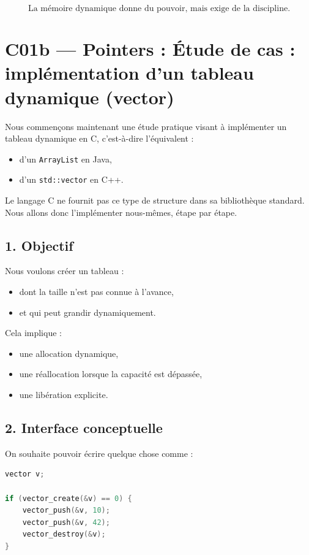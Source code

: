 \[
\boxed{\text{La mémoire dynamique donne du pouvoir, mais exige de la discipline.}}
\]

\section{C01b — Pointers : Étude de cas : implémentation d’un tableau dynamique (vector)}

Nous commençons maintenant une étude pratique visant à implémenter
un tableau dynamique en C, c’est-à-dire l’équivalent :

\begin{itemize}
    \item d’un \texttt{ArrayList} en Java,
    \item d’un \texttt{std::vector} en C++.
\end{itemize}

Le langage C ne fournit pas ce type de structure dans sa bibliothèque standard.
Nous allons donc l’implémenter nous-mêmes, étape par étape.

\subsection*{1. Objectif}

Nous voulons créer un tableau :

\begin{itemize}
    \item dont la taille n’est pas connue à l’avance,
    \item et qui peut grandir dynamiquement.
\end{itemize}

Cela implique :
\begin{itemize}
    \item une allocation dynamique,
    \item une réallocation lorsque la capacité est dépassée,
    \item une libération explicite.
\end{itemize}

\subsection*{2. Interface conceptuelle}

On souhaite pouvoir écrire quelque chose comme :

\begin{lstlisting}[language=C]
vector v;

if (vector_create(&v) == 0) {
    vector_push(&v, 10);
    vector_push(&v, 42);
    vector_destroy(&v);
}
\end{lstlisting}

